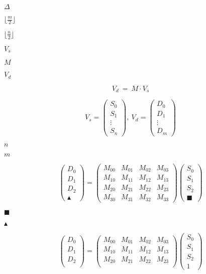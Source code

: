\documentclass{article}
\begin{document}
$\Delta$
\pagebreak

$ \lfloor \frac{m}{2} \rfloor$
\pagebreak

$ \lfloor \frac{n}{2} \rfloor$
\pagebreak

$V_{s}$
\pagebreak

$M$
\pagebreak

$V_{d}$
\pagebreak

\[ V_{d}\ =\ M \cdot V_{s} \]
\pagebreak

\[ V_{s}= \left(\begin{array}{c} S_{0}\\ S_{1}\\ \vdots \\ S_{n} \end{array}\right) ,\ V_{d}= \left(\begin{array}{c} D_{0}\\ D_{1}\\ \vdots \\ D_{m} \end{array}\right) \]
\pagebreak

$n$
\pagebreak

$m$
\pagebreak

\[ \left(\begin{array}{c} D_{0}\\ D_{1}\\ D_{2}\\ \blacktriangle \end{array}\right) = \left(\begin{array}{cccc} M_{00} & M_{01} & M_{02} & M_{03}\\ M_{10} & M_{11} & M_{12} & M_{13}\\ M_{20} & M_{21} & M_{22} & M_{23}\\ M_{30} & M_{31} & M_{32} & M_{33} \end{array}\right) \left(\begin{array}{c} S_{0}\\ S_{1}\\ S_{2}\\ \blacksquare \end{array}\right) \]
\pagebreak

$\blacksquare $
\pagebreak

$\blacktriangle$
\pagebreak

\[ \left(\begin{array}{c} D_{0}\\ D_{1}\\ D_{2}\\ \end{array}\right) = \left(\begin{array}{cccc} M_{00} & M_{01} & M_{02} & M_{03}\\ M_{10} & M_{11} & M_{12} & M_{13}\\ M_{20} & M_{21} & M_{22} & M_{23}\\ \end{array}\right) \left(\begin{array}{c} S_{0}\\ S_{1}\\ S_{2}\\ 1 \end{array}\right) \]
\pagebreak
\end{document}
